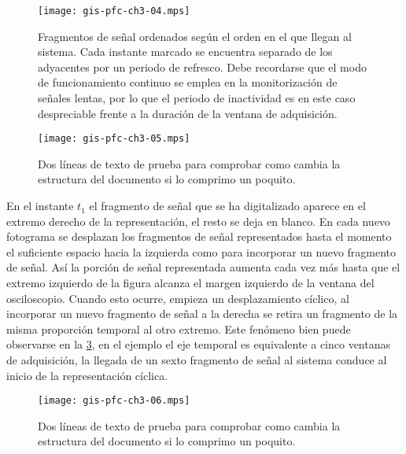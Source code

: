 \begin{figure}
	\begin{center}
		\texttt{[image: gis-pfc-ch3-04.mps]}
	\end{center}
	\caption[Fragmentos de señal ordenados según el orden en el que llegan al sistema]{Fragmentos de señal ordenados según el orden en el que llegan al sistema. Cada instante marcado se encuentra separado de los adyacentes por un periodo de refresco. Debe recordarse que el modo de funcionamiento continuo se emplea en la monitorización de señales lentas, por lo que el periodo de inactividad es en este caso despreciable frente a la duración de la ventana de adquisición.}
	\label{fig:freesignalcont}
\end{figure}

\begin{figure}
	\begin{center}
		\texttt{[image: gis-pfc-ch3-05.mps]}
	\end{center}
	\caption[Dos líneas de prueba]{Dos líneas de texto de prueba para comprobar como cambia la estructura del documento si lo comprimo un poquito.}
	\label{fig:modconti}
\end{figure}

En el instante $t_1$ el fragmento de señal que se ha digitalizado aparece en el extremo derecho de la representación, el resto se deja en blanco. En cada nuevo fotograma se desplazan los fragmentos de señal representados hasta el momento el suficiente espacio hacia la izquierda como para incorporar un nuevo fragmento de señal. Así la porción de señal representada aumenta cada vez más hasta que el extremo izquierdo de la figura alcanza el margen izquierdo de la ventana del osciloscopio. Cuando esto ocurre, empieza un desplazamiento cíclico, al incorporar un nuevo fragmento de señal a la derecha se retira un fragmento de la misma proporción temporal al otro extremo. Este fenómeno bien puede observarse en la \cref{fig:modcontii}, en el ejemplo el eje temporal es equivalente a cinco ventanas de adquisición, la llegada de un sexto fragmento de señal al sistema conduce al inicio de la representación cíclica.\par

\begin{figure}
	\begin{center}
		\texttt{[image: gis-pfc-ch3-06.mps]}
	\end{center}
	\caption[Dos líneas de prueba]{Dos líneas de texto de prueba para comprobar como cambia la estructura del documento si lo comprimo un poquito.}
	\label{fig:modcontii}
\end{figure}


